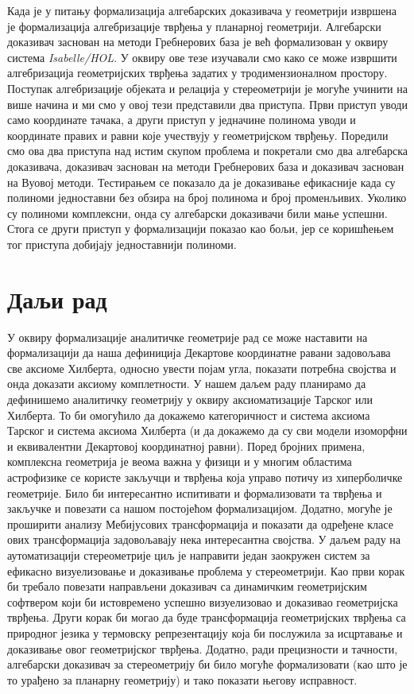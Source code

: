Када је у питању формализација алгебарских доказивача у геометрији
извршена је формализација алгебризације тврђења у планарној
геометрији. Алгебарски доказивач заснован на методи Гребнерових база
је већ формализован у оквиру система \emph{Isabelle/HOL}. У оквиру ове
тезе изучавали смо како се може извршити алгебризација геометријских
тврђења задатих у тродимензионалном простору. Поступак алгебризације
објеката и релација у стереометрији је могуће учинити на више начина и
ми смо у овој тези представили два приступа. Први приступ уводи само
координате тачака, а други приступ у једначине полинома уводи и
координате правих и равни које учествују у геометријском
тврђењу. Поредили смо ова два приступа над истим скупом проблема и
покретали смо два алгебарска доказивача, доказивач заснован на методи
Гребнерових база и доказивач заснован на Вуовој методи. Тестирањем се
показало да је доказивање ефикасније када су полиноми једноставни без
обзира на број полинома и број променљивих. Уколико су полиноми
комплексни, онда су алгебарски доказивачи били мање успешни. Стога се
други приступ у формализацији показао као бољи, јер се коришћењем тог
приступа добијају једноставнији полиноми.


\section{Даљи рад}

У оквиру формализације аналитичке геометрије рад се може наставити на
формализацији да наша дефиниција Декартове координатне равани
задовољава све аксиоме Хилберта, односно увести појам угла, показати
потребна својства и онда доказати аксиому комплетности. У нашем даљем
раду планирамо да дефинишемо аналитичку геометрију у оквиру
аксиоматизације Тарског или Хилберта. То би омогућило да докажемо
категоричност и система аксиома Тарског и система аксиома Хилберта (и
да докажемо да су сви модели изоморфни и еквивалентни Декартовој
координатној равни). Поред бројних примена, комплексна геометрија је
веома важна у физици и у многим областима астрофизике се користе
закључци и тврђења која управо потичу из хиперболичке геометрије. Било
би интересантно испитивати и формализовати та тврђења и закључке и
повезати са нашом постојећом формализацијом. Додатно, могуће је
проширити анализу Мебијусових трансформација и показати да одређене
класе ових трансформација задовољавају нека интересантна својства. У
даљем раду на аутоматизацији стереометрије циљ је направити један
заокружен систем за ефикасно визуелизовање и доказивање проблема у
стереометрији. Као први корак би требало повезати направљени доказивач
са динамичким геометријским софтвером који би истовремено успешно
визуелизовао и доказивао геометријска тврђења. Други корак би могао да
буде трансформација геометријских тврђења са природног језика у
термовску репрезентацију која би послужила за исцртавање и доказивање
овог геометријског тврђења. Додатно, ради прецизности и тачности,
алгебарски доказивач за стереометрију би било могуће формализовати
(као што је то урађено за планарну геометрију) и тако показати његову
исправност.

